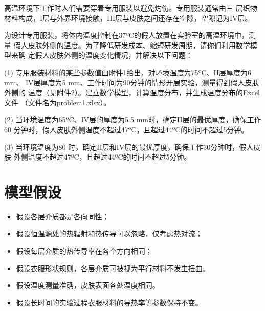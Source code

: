 \documentclass{cumcmthesis}
\begin{document}
        高温环境下工作时人们需要穿着专用服装以避免灼伤。专用服装通常由三
    层织物材料构成，I层与外界环境接触，III层与皮肤之间还存在空隙，空隙记为IV层。

        为设计专用服装，将体内温度控制在37ºC的假人放置在实验室的高温环境中，测量
    假人皮肤外侧的温度。为了降低研发成本、缩短研发周期，请你们利用数学模型来确
    定假人皮肤外侧的温度变化情况，并解决以下问题：

        (1) 专用服装材料的某些参数值由附件1给出，对环境温度为75ºC、II层厚度为6 mm、
        IV层厚度为5 mm、工作时间为90分钟的情形开展实验，测量得到假人皮肤外侧的
        温度（见附件2）。建立数学模型，计算温度分布，并生成温度分布的Excel文件
        （文件名为problem1.xlsx）。

        (2) 当环境温度为65ºC、IV层的厚度为5.5 mm时，确定II层的最优厚度，确保工作60
        分钟时，假人皮肤外侧温度不超过47ºC，且超过44ºC的时间不超过5分钟。
    
        (3) 当环境温度为80 时，确定II层和IV层的最优厚度，确保工作30分钟时，假人皮肤
        外侧温度不超过47ºC，且超过44ºC的时间不超过5分钟。

\section{模型假设}

\begin{itemize}
\item 假设各层介质都是各向同性；
\item 假设恒温源处的热辐射和热传导可以忽略，仅考虑热对流；
\item 假设每层介质的热传导率在各个方向相同；
\item 假设衣服形状规则，各层介质可被视为平行材料不发生扭曲。
\item 假设温度测量准确，皮肤表面各处温度相同。
\item 假设长时间的实验过程衣服材料的导热率等参数保持不变。
\end{itemize}
\end{document}
